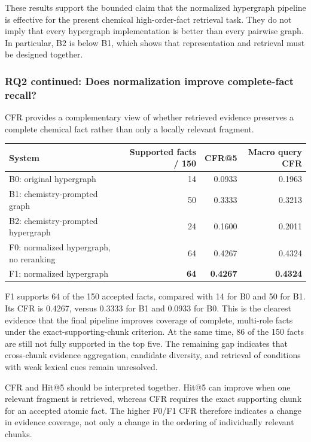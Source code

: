 These results support the bounded claim that the normalized hypergraph pipeline is effective for the present chemical high-order-fact retrieval task. They do not imply that every hypergraph implementation is better than every pairwise graph. In particular, B2 is below B1, which shows that representation and retrieval must be designed together.

\subsubsection{RQ2 continued: Does normalization improve complete-fact recall?}

CFR provides a complementary view of whether retrieved evidence preserves a complete chemical fact rather than only a locally relevant fragment.

\begin{table}[t]
\centering
\small
\begin{tabularx}{\linewidth}{Xrrr}
\toprule
System & Supported facts / 150 & CFR@5 & Macro query CFR \\
\midrule
B0: original hypergraph & 14 & 0.0933 & 0.1963 \\
B1: chemistry-prompted graph & 50 & 0.3333 & 0.3213 \\
B2: chemistry-prompted hypergraph & 24 & 0.1600 & 0.2011 \\
F0: normalized hypergraph, no reranking & 64 & 0.4267 & 0.4324 \\
F1: normalized hypergraph & \textbf{64} & \textbf{0.4267} & \textbf{0.4324} \\
\bottomrule
\end{tabularx}
\end{table}

F1 supports 64 of the 150 accepted facts, compared with 14 for B0 and 50 for B1. Its CFR is 0.4267, versus 0.3333 for B1 and 0.0933 for B0. This is the clearest evidence that the final pipeline improves coverage of complete, multi-role facts under the exact-supporting-chunk criterion. At the same time, 86 of the 150 facts are still not fully supported in the top five. The remaining gap indicates that cross-chunk evidence aggregation, candidate diversity, and retrieval of conditions with weak lexical cues remain unresolved.

CFR and Hit@5 should be interpreted together. Hit@5 can improve when one relevant fragment is retrieved, whereas CFR requires the exact supporting chunk for an accepted atomic fact. The higher F0/F1 CFR therefore indicates a change in evidence coverage, not only a change in the ordering of individually relevant chunks.

